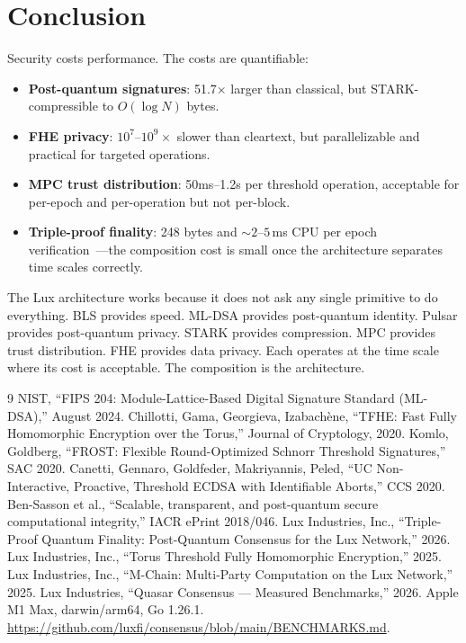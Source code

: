 \section{Conclusion}


Security costs performance. The costs are quantifiable:

\begin{itemize}[leftmargin=2em]
\item \textbf{Post-quantum signatures}: 51.7$\times$ larger than classical, but STARK-compressible to $O(\log N)$ bytes.
\item \textbf{FHE privacy}: $10^7$--$10^9\times$ slower than cleartext, but parallelizable and practical for targeted operations.
\item \textbf{MPC trust distribution}: 50ms--1.2s per threshold operation, acceptable for per-epoch and per-operation but not per-block.
\item \textbf{Triple-proof finality}: 248 bytes and ${\sim}2$--$5$\,ms CPU per epoch verification~\cite{lux-benchmarks}---the composition cost is small once the architecture separates time scales correctly.
\end{itemize}

The Lux architecture works because it does not ask any single primitive to do everything. BLS provides speed. ML-DSA provides post-quantum identity. Pulsar provides post-quantum privacy. STARK provides compression. MPC provides trust distribution. FHE provides data privacy. Each operates at the time scale where its cost is acceptable. The composition is the architecture.

\begin{thebibliography}{9}
 NIST, ``FIPS 204: Module-Lattice-Based Digital Signature Standard (ML-DSA),'' August 2024.
 Chillotti, Gama, Georgieva, Izabach\`{e}ne, ``TFHE: Fast Fully Homomorphic Encryption over the Torus,'' Journal of Cryptology, 2020.
 Komlo, Goldberg, ``FROST: Flexible Round-Optimized Schnorr Threshold Signatures,'' SAC 2020.
 Canetti, Gennaro, Goldfeder, Makriyannis, Peled, ``UC Non-Interactive, Proactive, Threshold ECDSA with Identifiable Aborts,'' CCS 2020.
 Ben-Sasson et al., ``Scalable, transparent, and post-quantum secure computational integrity,'' IACR ePrint 2018/046.
 Lux Industries, Inc., ``Triple-Proof Quantum Finality: Post-Quantum Consensus for the Lux Network,'' 2026.
 Lux Industries, Inc., ``Torus Threshold Fully Homomorphic Encryption,'' 2025.
 Lux Industries, Inc., ``M-Chain: Multi-Party Computation on the Lux Network,'' 2025.
 Lux Industries, ``Quasar Consensus --- Measured Benchmarks,'' 2026. Apple M1 Max, darwin/arm64, Go 1.26.1. \url{https://github.com/luxfi/consensus/blob/main/BENCHMARKS.md}.
\end{thebibliography}

